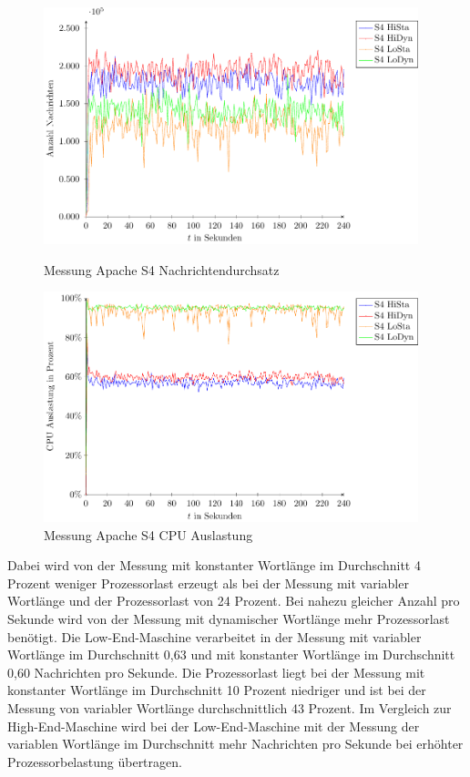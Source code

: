 \begin{figure}[!ht]
\includegraphics[width=0.97\textwidth]{plots/messungS4Durchsatz.pdf}
\caption{Messung Apache S4 Nachrichtendurchsatz
\label{fig:messungS4Nd}}
\includegraphics[width=0.97\textwidth]{plots/messungS4Cpu.pdf}
\caption{Messung Apache S4 CPU Auslastung
\label{fig:messungS4Cpu}}
\end{figure}

Dabei wird von der Messung mit konstanter Wortlänge im Durchschnitt 4 Prozent weniger Prozessorlast erzeugt als bei der Messung mit variabler Wortlänge und der Prozessorlast von 24 Prozent. Bei nahezu gleicher Anzahl pro Sekunde wird von der Messung mit dynamischer Wortlänge mehr Prozessorlast benötigt. Die Low-End-Maschine verarbeitet in der Messung mit variabler Wortlänge im Durchschnitt 0,63 und mit konstanter Wortlänge im Durchschnitt 0,60 Nachrichten pro Sekunde. Die Prozessorlast liegt bei der Messung mit konstanter Wortlänge im Durchschnitt 10 Prozent niedriger und ist bei der Messung von variabler Wortlänge durchschnittlich 43 Prozent. Im Vergleich zur High-End-Maschine wird bei der Low-End-Maschine mit der Messung der variablen Wortlänge im Durchschnitt mehr Nachrichten pro Sekunde bei erhöhter Prozessorbelastung übertragen.



